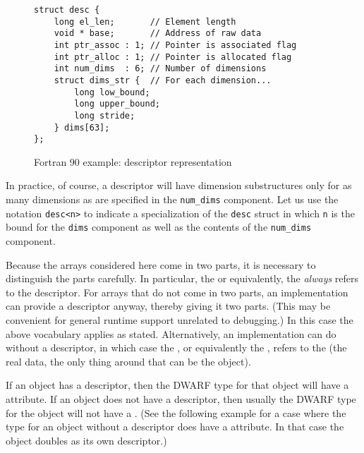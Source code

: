 \begin{figure}[here]
\begin{lstlisting}
struct desc {
    long el_len;       // Element length
    void * base;       // Address of raw data
    int ptr_assoc : 1; // Pointer is associated flag
    int ptr_alloc : 1; // Pointer is allocated flag
    int num_dims  : 6; // Number of dimensions
    struct dims_str {  // For each dimension...  
        long low_bound;
        long upper_bound;
        long stride;
    } dims[63];
};
\end{lstlisting}
\caption{Fortran 90 example: descriptor representation}
\label{fig:fortran90exampledescriptorrepresentation}
\end{figure}


In practice, of course, a  descriptor will have
dimension substructures only for as many dimensions as are
specified in the \texttt{num\_dims} component. Let us use the notation
\texttt{desc\textless n\textgreater}   
to indicate a specialization of the \texttt{desc} struct in
which \texttt{n} is the bound for the \texttt{dims} component as well as the
contents of the \texttt{num\_dims} component.

Because the arrays considered here come in two parts, it is
necessary to distinguish the parts carefully. In particular,
the  or equivalently, the  \emph{always} refers to the descriptor. For
arrays that do not come in two parts, an implementation can
provide a descriptor anyway, thereby giving it two parts. (This
may be convenient for general runtime support unrelated to
debugging.) In this case the above vocabulary applies as
stated. Alternatively, an implementation can do without a
descriptor, in which case the ,
or equivalently the , refers
to the  (the real data, the only thing around
that can be the object).

If an object has a descriptor, then the DWARF type for that
object will have a 
attribute. If an object
does not have a descriptor, then usually the DWARF type for the
object will not have a 
. 
(See the following
 example for a case where the type for an object without
a descriptor does have a 
 attribute. In
that case the object doubles as its own descriptor.)

